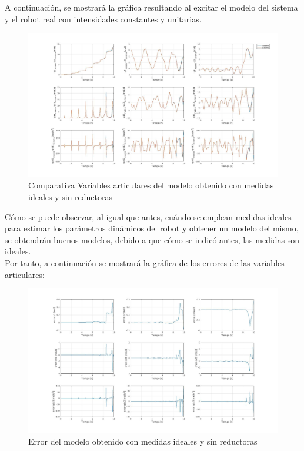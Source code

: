 A continuación, se mostrará la gráfica resultando al excitar el modelo del sistema y el robot real con intensidades constantes y unitarias.



\newpage

\begin{figure}[h!]

	\centering

	\includegraphics[width=1\textwidth]{EstimacParam_SisMod_In1_IdealSR}

	\caption{Comparativa Variables articulares del modelo obtenido con medidas ideales y sin reductoras}

\end{figure}



Cómo se puede observar, al igual que antes, cuándo se emplean medidas ideales para estimar los parámetros dinámicos del robot y obtener un modelo del mismo, se obtendrán buenos modelos, debido a que cómo se indicó antes, las medidas son ideales. \\

Por tanto, a continuación se mostrará la gráfica de los errores de las variables articulares:



\begin{figure}[h!]

	\centering

	\includegraphics[width=1\textwidth]{EstimacParam_SisModError_In1_IdealSR}

	\caption{Error del modelo obtenido con medidas ideales y sin reductoras}

\end{figure}



